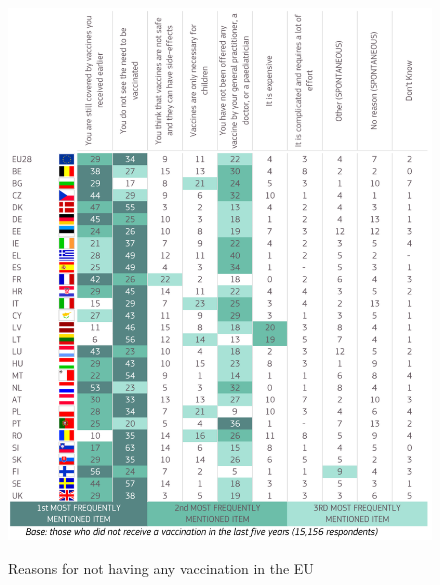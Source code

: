\documentclass[12pt,a4paper,twoside]{article}
\begin{document}
\begin{figure}
	\centering %
	\def\svgwidth{75pt}
	\caption{Reasons for not having any vaccination in the EU \cite{KantarBelgium2019}}
	\includegraphics[scale=0.5]{img/vaccine_hesitancy_EU_MULTIPLE_ANSWERS.png}
	\label{fig:vaccine_mistrust_eu}
\end{figure}

\newpage
\end{document}
